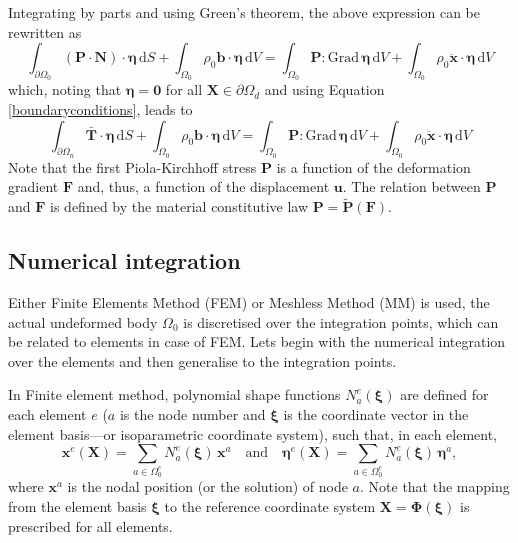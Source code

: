 \documentclass[oneside,11pt,times]{book}
\begin{document}
Integrating by parts and using Green's theorem, the above expression can be rewritten as
%
\begin{equation} \label{equationWeakBalanceMomentum1}
 \int_{\partial \Omega_0} (\bm{P} \cdot \bm{N}) \cdot \bm{\eta} \, \text{d} S + \int_{\Omega_0} \rho_0 \bm{b} \cdot \bm{\eta}  \, \text{d} V = \int_{\Omega_0} \bm{P} : \text{Grad} \, \bm{\eta} \, \text{d} V + \int_{\Omega_0} \rho_0 \ddot{\bm{x}} \cdot \bm{\eta}  \, \text{d} V
\end{equation}
%
which, noting that $\bm{\eta} = \bm{0}$ for all $\bm{X} \in \partial \Omega_d$ and using Equation \eqref{boundaryconditions}, leads to
%
\begin{equation} \label{equationWeakBalanceMomentum2}
 \int_{\partial \Omega_n} \bar{\bm{T}} \cdot \bm{\eta} \, \text{d} S + \int_{\Omega_0} \rho_0 \bm{b} \cdot \bm{\eta}  \, \text{d} V = \int_{\Omega_0} \bm{P} : \text{Grad} \, \bm{\eta} \, \text{d} V + \int_{\Omega_0} \rho_0 \ddot{\bm{x}} \cdot \bm{\eta}  \, \text{d} V
\end{equation}
%
Note that the first Piola-Kirchhoff stress $\bm{P}$ is a function of the deformation gradient $\bm{F}$ and, thus, a function of the displacement $\bm{u}$. The relation between $\bm{P}$ and $\bm{F}$ is defined by the material constitutive law $\bm{P} = \tilde{\bm{P}}(\bm{F})$.

\subsection{Numerical integration}\label{sectionNumerical integration}

 Either Finite Elements Method (FEM) or Meshless Method (MM) is used, the actual undeformed body $\Omega_0$ is discretised over the integration points, which can be related to elements in case of FEM. Lets begin with the numerical integration over the elements and then generalise to the integration points.

In Finite element method, polynomial shape functions $N^e_a(\bm{\xi})$ are defined for each element $e$ ($a$ is the node number and $\bm{\xi}$ is the coordinate vector in the element basis---or isoparametric coordinate system), such that, in each element,
%
\begin{equation} \label{equationElementApproximation}
 \bm{x}^e(\bm{X}) = \sum_{a \in \Omega_{0}^e} N^e_a(\bm{\xi}) \, \bm{x}^a \quad \textrm{and} \quad
 \bm{\eta}^e(\bm{X}) = \sum_{a \in \Omega_{0}^e} N^e_a(\bm{\xi}) \, \bm{\eta}^a ,
\end{equation}
%
where $\bm{x}^a$ is the nodal position (or the solution) of node $a$. Note that the mapping from the element basis $\bm{\xi}$ to the reference coordinate system $\bm{X} = \bm{\Phi}(\bm{\xi})$ is prescribed for all elements.\\
\end{document}
